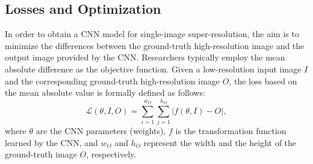 \documentclass{ieeeaccess}
\begin{document}
\subsection{Losses and Optimization}

In order to obtain a CNN model for single-image super-resolution, the aim is to minimize the differences between the ground-truth high-resolution image and the output image provided by the CNN. Researchers typically employ the mean absolute difference as the objective function. Given a low-resolution input image $I$ and the corresponding ground-truth high-resolution image $O$, the loss based on the mean absolute value is formally defined as follows:
\begin{equation}\label{eq_loss_std}
\mathcal{L}(\theta,I,O) = \sum_{i=1}^{w_O} \sum_{j=1}^{h_O} | f(\theta,I) - O |,  
\end{equation}
where $\theta$ are the CNN parameters (weights), $f$ is the transformation function learned by the CNN, and $w_O$ and $h_O$ represent the width and the height of the ground-truth image $O$, respectively. 
\end{document}
